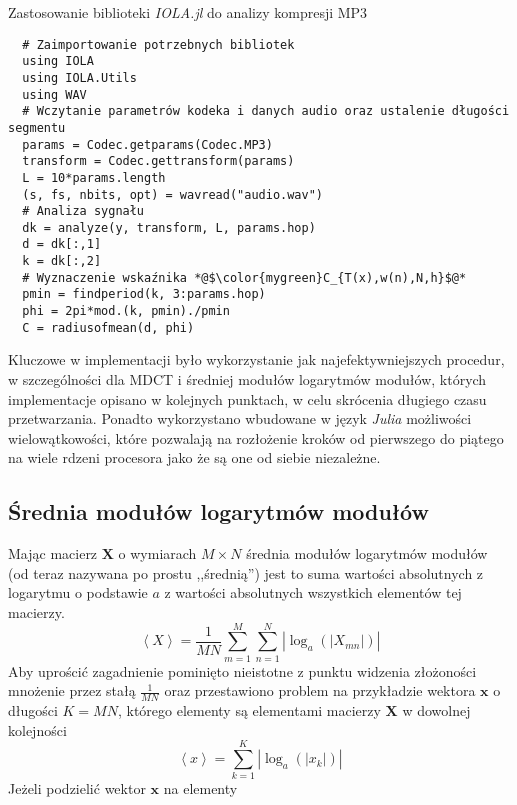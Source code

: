 \documentclass[pl,12pt]{aghdpl}
\let\Oldsubsection\subsection%
\renewcommand{\subsection}{\FloatBarrier\Oldsubsection}
\begin{document}
\begin{program}
  \caption{Zastosowanie biblioteki \textit{IOLA.jl} do analizy kompresji MP3}
  \label{lst:IOLA_example}
  \begin{lstlisting}
  # Zaimportowanie potrzebnych bibliotek
  using IOLA
  using IOLA.Utils
  using WAV
  # Wczytanie parametrów kodeka i danych audio oraz ustalenie długości segmentu
  params = Codec.getparams(Codec.MP3)
  transform = Codec.gettransform(params)
  L = 10*params.length
  (s, fs, nbits, opt) = wavread("audio.wav")
  # Analiza sygnału
  dk = analyze(y, transform, L, params.hop)
  d = dk[:,1]
  k = dk[:,2]
  # Wyznaczenie wskaźnika *@$\color{mygreen}C_{T(x),w(n),N,h}$@*
  pmin = findperiod(k, 3:params.hop)
  phi = 2pi*mod.(k, pmin)./pmin
  C = radiusofmean(d, phi)
  \end{lstlisting}
\end{program}

Kluczowe w implementacji było wykorzystanie jak najefektywniejszych procedur, w
szczególności dla MDCT i średniej modułów logarytmów modułów, których
implementacje opisano w kolejnych punktach, w celu skrócenia
długiego czasu przetwarzania. Ponadto wykorzystano wbudowane w język
\textit{Julia} możliwości wielowątkowości, które pozwalają na rozłożenie kroków
od pierwszego do piątego na wiele rdzeni procesora jako że są one od siebie
niezależne.
\subsection{Średnia modułów logarytmów modułów}
Mając macierz $\bm X$ o wymiarach $M \times N$ średnia modułów logarytmów modułów
(od teraz nazywana po prostu ,,średnią'') jest to suma wartości absolutnych z
logarytmu o podstawie $a$ z wartości absolutnych wszystkich elementów tej
macierzy.
\begin{equation}
  \left<X\right> =
  \frac{1}{MN}\sum_{m=1}^{M}\sum_{n=1}^{N}\left|\log_{a}\left(\left|X_{mn}\right|\right)\right|
\end{equation}
Aby uprościć zagadnienie pominięto nieistotne z punktu widzenia złożoności
mnożenie przez stałą $\frac{1}{MN}$ oraz przestawiono problem na przykładzie
wektora $\bm x$ o długości $K=MN$, którego elementy są elementami macierzy $\bm
  X$ w dowolnej kolejności
\begin{equation}
  \left<x\right> = \sum_{k=1}^{K}\left|\log_{a}\left(\left|x_{k}\right|\right)\right|
\end{equation}
Jeżeli podzielić wektor $\bm x$ na elementy
\end{document}
